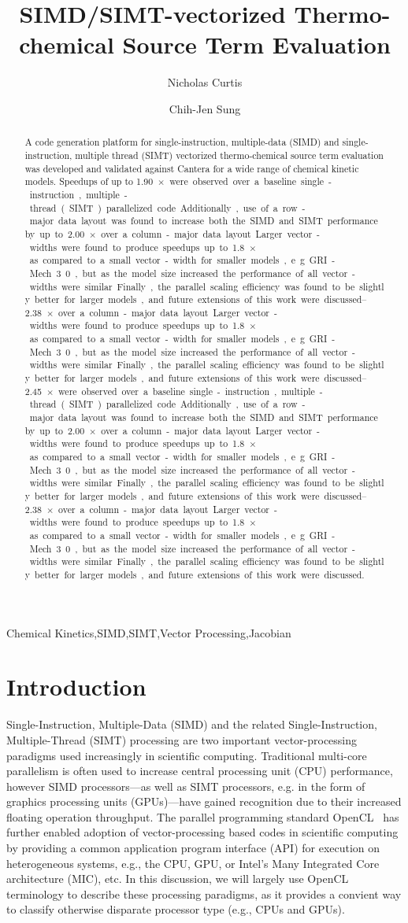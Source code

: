 \documentclass[12pt,number,sort&compress]{elsarticle}
\title{SIMD\slash SIMT-vectorized Thermo-chemical Source Term Evaluation}
\author[1]{Nicholas Curtis\corref{corr}}
\author[1]{Chih-Jen Sung}
\begin{document}
\begin{frontmatter}

\begin{abstract} %
A code generation platform for single-instruction, multiple-data (SIMD) and single-instruction, multiple thread (SIMT) vectorized thermo-chemical source term evaluation was developed and validated against Cantera for a wide range of chemical kinetic models.
Speedups of up to \SIrange{1.90}{2.45}{$\times$} were observed over a baseline single-instruction, multiple-thread (SIMT) parallelized code.
Additionally, use of a row-major data layout was found to increase both the SIMD and SIMT performance by up to \SIrange{2.00}{2.38}{$\times$} over a column-major data layout.
Larger vector-widths were found to produce speedups up to \SI{1.8}{$\times$} as compared to a small vector-width for smaller models, e.g. GRI-Mech 3.0, but as the model size increased the performance of all vector-widths were similar.
Finally, the parallel scaling efficiency was found to be slightly better for larger models, and future extensions of this work were discussed.
\end{abstract}

\begin{keyword}
    Chemical Kinetics\sep SIMD\sep SIMT\sep Vector Processing\sep Jacobian
\end{keyword}

\end{frontmatter}

\section{Introduction}
%

Single-Instruction, Multiple-Data (SIMD) and the related Single-Instruction, Multiple-Thread (SIMT) processing are two important vector-processing paradigms used increasingly in scientific computing.
Traditional multi-core parallelism is often used to increase central processing unit (CPU) performance, however SIMD processors---as well as SIMT processors, e.g. in the form of graphics processing units (GPUs)---have gained recognition due to their increased floating operation throughput.
The parallel programming standard OpenCL~\cite{stone2010opencl} has further enabled adoption of vector-processing based codes in scientific computing by providing a common application program interface (API) for execution on heterogeneous systems, e.g., the CPU, GPU, or Intel's Many Integrated Core architecture (MIC), etc.
In this discussion, we will largely use OpenCL terminology to describe these processing paradigms, as it provides a convient way to classify otherwise disparate processor type (e.g., CPUs and GPUs).
\end{document}

